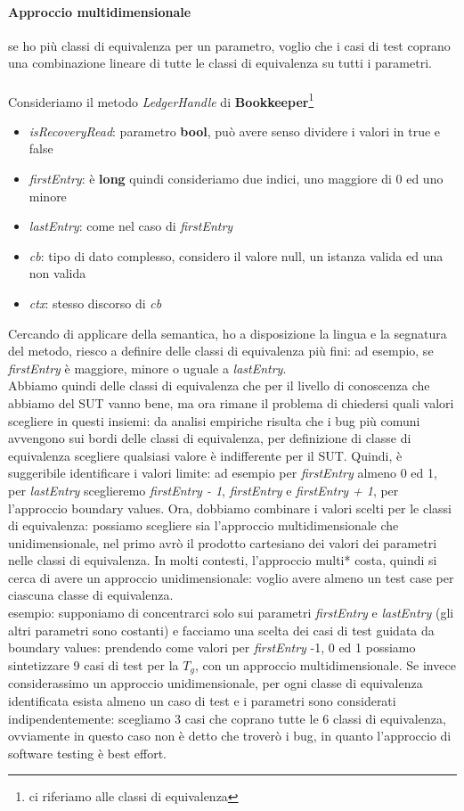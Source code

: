 \documentclass{article}
\begin{document}
\paragraph{Approccio multidimensionale}se ho più classi di equivalenza per un parametro, voglio che i casi di test coprano una combinazione lineare di tutte le classi di equivalenza su tutti i parametri.
\\\\ Consideriamo il metodo \textit{LedgerHandle} di \textbf{Bookkeeper}\footnote{ci riferiamo alle classi di equivalenza}
\begin{itemize}
\item \textit{isRecoveryRead}: parametro \textbf{bool}, può avere senso dividere i valori in true e false
\item \textit{firstEntry}: è \textbf{long} quindi consideriamo due indici, uno maggiore di 0 ed uno minore
\item \textit{lastEntry}: come nel caso di \textit{firstEntry}
\item \textit{cb}: tipo di dato complesso, considero il valore null, un istanza valida ed una non valida
\item \textit{ctx}: stesso discorso di \textit{cb}
\end{itemize}
Cercando di applicare della semantica, ho a disposizione la lingua e la segnatura del metodo, riesco a definire delle classi di equivalenza più fini: ad esempio, se \textit{firstEntry} è maggiore, minore o uguale a \textit{lastEntry}.\\ Abbiamo quindi delle classi di equivalenza che per il livello di conoscenza che abbiamo del SUT vanno bene, ma ora rimane il problema di chiedersi quali valori scegliere in questi insiemi: da analisi empiriche risulta che i bug più comuni avvengono sui bordi delle classi di equivalenza, per definizione di classe di equivalenza scegliere qualsiasi valore è indifferente per il SUT. Quindi, è suggeribile identificare i valori limite: ad esempio per \textit{firstEntry} almeno 0 ed 1, per \textit{lastEntry} sceglieremo \textit{firstEntry - 1}, \textit{firstEntry} e \textit{firstEntry + 1}, per l'approccio boundary values. Ora, dobbiamo combinare i valori scelti per le classi di equivalenza: possiamo scegliere sia l'approccio multidimensionale che unidimensionale, nel primo avrò il prodotto cartesiano dei valori dei parametri nelle classi di equivalenza. In molti contesti, l'approccio multi* costa, quindi si cerca di avere un approccio unidimensionale: voglio avere almeno un test case per ciascuna classe di equivalenza.\\esempio: supponiamo di concentrarci solo sui parametri \textit{firstEntry} e \textit{lastEntry} (gli altri parametri sono costanti) e facciamo una scelta dei casi di test guidata da boundary values: prendendo come valori per \textit{firstEntry} -1, 0 ed 1 possiamo sintetizzare 9 casi di test per la $T_g$, con un approccio multidimensionale. Se invece considerassimo un approccio unidimensionale, per ogni classe di equivalenza identificata esista almeno un caso di test e i parametri sono considerati indipendentemente: scegliamo 3 casi che coprano tutte le 6 classi di equivalenza, ovviamente in questo caso non è detto che troverò i bug, in quanto l'approccio di software testing è best effort.
\end{document}
